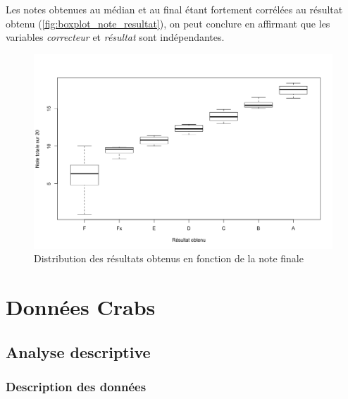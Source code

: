 \documentclass[a4paper,11pt]{report}
\begin{document}
Les notes obtenues au médian et au final étant fortement corrélées au résultat obtenu (\autoref{fig:boxplot_note_resultat}), on peut conclure en affirmant que les variables \textit{correcteur} et \textit{résultat} sont indépendantes.

\begin{figure}[H]
	\centering
	\captionsetup{justification=centering, margin=4cm}
	\includegraphics[width=.5\linewidth]{img/1-1-2-Boxplot-note-resultat}
	\caption{\scriptsize Distribution des résultats obtenus en fonction de la note finale}
	\label{fig:boxplot_note_resultat}
\end{figure}

\section{Données Crabs}

\subsection{Analyse descriptive}

\subsubsection{Description des données}
\label{subsection:describe_crabs}
\end{document}

